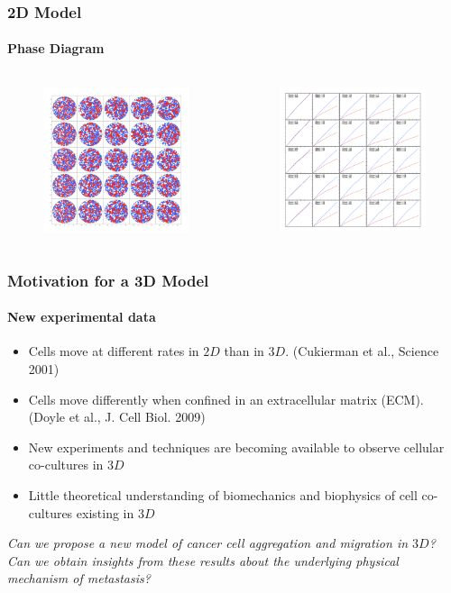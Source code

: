 \documentclass{beamer}
\begin{document}
  \begin{frame}
    \frametitle{2D Model}
    \framesubtitle{Phase Diagram}
    \begin{columns}[t] 
    \begin{figure}
    \includegraphics[width=2.2in]{posPhase2D.png}
    \end{figure}
    \begin{figure}
    \includegraphics[width=2.2in]{msdPhase2D.png}
    \end{figure}
    \end{columns}
    \vfill
  \end{frame}
  

  \begin{frame}
    \frametitle{Motivation for a 3D Model}
    \framesubtitle{New experimental data}
    
    \begin{itemize}
    \item Cells move at different rates in $2D$ than in $3D$.
    (Cukierman et al., Science 2001)
    \item Cells move differently when confined in an extracellular matrix (ECM). 
    (Doyle et al., J. Cell Biol. 2009)       
    \item New experiments and techniques are becoming available to observe cellular co-cultures in $3D$
    
    \item Little theoretical understanding of biomechanics and biophysics of cell co-cultures existing in $3D$
    \end{itemize}
    
    
	\center\emph{Can we propose a new model of cancer cell aggregation and migration in $3D$? \\
	Can we obtain insights from these results about the underlying physical mechanism of metastasis?}
    
    \vfill
    
  \end{frame}
    
\end{document}
